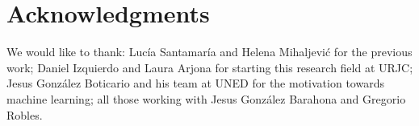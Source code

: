 \documentclass[a4paper]{article}
\begin{document}
\section*{Acknowledgments}

We would like to thank: Lucía Santamaría and Helena Mihaljevi\'c for the previous work; Daniel Izquierdo and Laura Arjona for starting this research field at URJC; Jesus González Boticario and his team at UNED for the motivation towards machine learning; all those working with Jesus González Barahona and Gregorio Robles.

 

\end{document}
